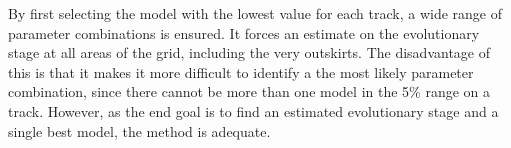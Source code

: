  By first selecting the model with the lowest \chis value for each track, a wide range of parameter combinations is ensured. It forces an estimate on the evolutionary stage at all areas of the grid, including the very outskirts. The disadvantage of this is that it makes it more difficult to identify a the most likely parameter combination, since there cannot be more than one model in the 5\% range on a track. However, as the end goal is to find an estimated evolutionary stage and a single best model, the method is adequate.





